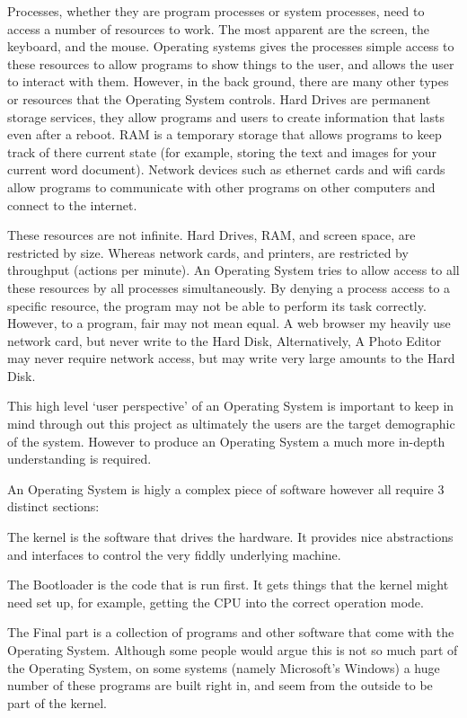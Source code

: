 \documentclass[a4paper]{report}
\begin{document}
Processes, whether they are program processes or system processes, need to access a number of resources to work. The most apparent are the screen, the keyboard, and the mouse. Operating systems gives the processes simple access to these resources to allow programs to show things to the user, and allows the user to interact with them. However, in the back ground, there are many other types or resources that the Operating System controls. Hard Drives are permanent storage services, they allow programs and users to create information that lasts even after a reboot. RAM is a temporary storage that allows programs to keep track of there current state (for example, storing the text and images for your current word document). Network devices such as ethernet cards and wifi cards allow programs to communicate with other programs on other computers and connect to the internet.

These resources are not infinite. Hard Drives, RAM, and screen space, are restricted by size. Whereas network cards, and printers, are restricted by throughput (actions per minute). An Operating System tries to allow access to all these resources by all processes simultaneously. By denying a process access to a specific resource, the program may not be able to perform its task correctly. However, to a program, fair may not mean equal. A web browser my heavily use network card, but never write to the Hard Disk, Alternatively, A Photo Editor may never require network access, but may write very large amounts to the Hard Disk.

This high level `user perspective' of an Operating System is important to keep in mind through out this project as ultimately the users are the target demographic of the system. However to produce an Operating System a much more in-depth understanding is required.




An Operating System is higly a complex piece of software however all require 3 distinct sections:

The kernel is the software that drives the hardware. It provides nice abstractions and interfaces to control the very fiddly underlying machine.

The Bootloader is the code that is run first. It gets things that the kernel might need set up, for example, getting the CPU into the correct operation mode.

The Final part is a collection of programs and other software that come with the Operating System. Although some people would argue this is not so much part of the Operating System, on some systems (namely Microsoft's Windows) a huge number of these programs are built right in, and seem from the outside to be part of the kernel.
\end{document}
